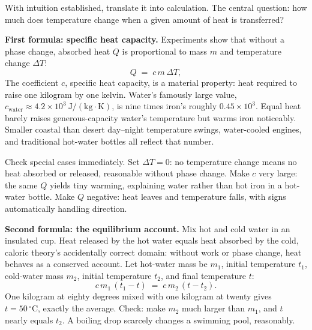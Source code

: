 
With intuition established, translate it into calculation. The central question: how much does temperature change when a given amount of heat is transferred?

\textbf{First formula: specific heat capacity.} Experiments show that without a phase change, absorbed heat \(Q\) is proportional to mass \(m\) and temperature change \(\Delta T\):
\[
Q \;=\; c\, m\, \Delta T,
\]
The coefficient \(c\), specific heat capacity, is a material property: heat required to raise one kilogram by one kelvin. Water's famously large value, \(c_{\text{water}} \approx 4.2\times10^{3}\ \mathrm{J/(kg\cdot K)}\), is nine times iron's roughly \(0.45\times10^{3}\). Equal heat barely raises generous-capacity water's temperature but warms iron noticeably. Smaller coastal than desert day--night temperature swings, water-cooled engines, and traditional hot-water bottles all reflect that number.

Check special cases immediately. Set \(\Delta T = 0\): no temperature change means no heat absorbed or released, reasonable without phase change. Make \(c\) very large: the same \(Q\) yields tiny warming, explaining water rather than hot iron in a hot-water bottle. Make \(Q\) negative: heat leaves and temperature falls, with signs automatically handling direction.

\textbf{Second formula: the equilibrium account.} Mix hot and cold water in an insulated cup. Heat released by the hot water equals heat absorbed by the cold, caloric theory's accidentally correct domain: without work or phase change, heat behaves as a conserved account. Let hot-water mass be \(m_1\), initial temperature \(t_1\), cold-water mass \(m_2\), initial temperature \(t_2\), and final temperature \(t\):
\[
c\,m_1\,(t_1 - t) \;=\; c\,m_2\,(t - t_2).
\]
One kilogram at eighty degrees mixed with one kilogram at twenty gives \(t = 50\,^\circ\mathrm{C}\), exactly the average. Check: make \(m_2\) much larger than \(m_1\), and \(t\) nearly equals \(t_2\). A boiling drop scarcely changes a swimming pool, reasonably.

